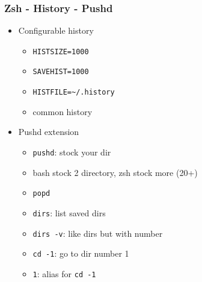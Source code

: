 \subsubsection{Zsh - History - Pushd}
\begin{frame}[fragile]{\subsubsecname}
  \begin{itemize}
    \item Configurable history
    \begin{itemize}
      \item \texttt{HISTSIZE=1000}
      \item \texttt{SAVEHIST=1000}
      \item \texttt{HISTFILE=\textasciitilde{}/.history}
      \item common history
    \end{itemize}
    \item Pushd extension
    \begin{itemize}
      \item \texttt{pushd}: stock your dir
      \item bash stock 2 directory, zsh stock more (20+)
      \item \texttt{popd}
      \item \texttt{dirs}: list saved dirs
      \item \texttt{dirs -v}: like dirs but with number
      \item \texttt{cd -1}: go to dir number 1
      \item \texttt{1}: alias for \texttt{cd -1}
    \end{itemize}
  \end{itemize}
\end{frame}
